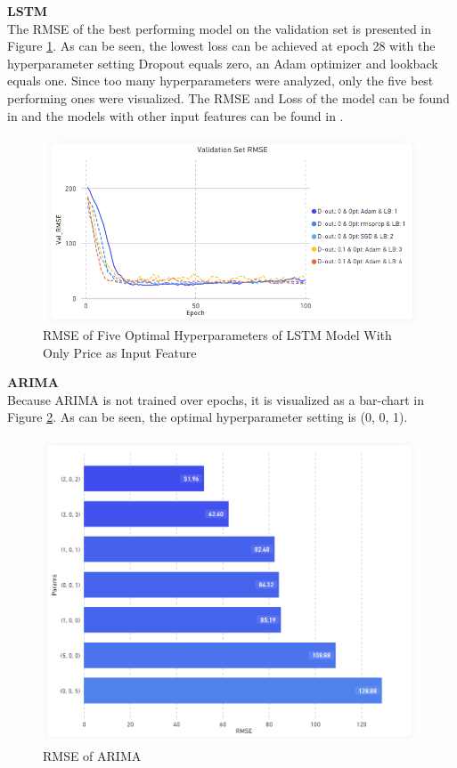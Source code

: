 \documentclass[11pt, a4paper]{article}
\begin{document}
\noindent\textbf{LSTM}\\
The RMSE of the best performing model on the validation set is presented in Figure \ref{fig:lstm_price_rmse_best_params}. As can be seen, the lowest loss can be achieved
at epoch 28 with the hyperparameter setting Dropout equals zero, an Adam optimizer and lookback equals one. Since too many hyperparameters
were analyzed, only the five best performing ones were visualized. 
The RMSE and Loss of the model can be found in  and the models with other input features can be found in .
\begin{figure}[!h]
    \centering
    \includegraphics[scale = 0.45]{Only_Price_Params_RMSE_Validation_Set.png}
    \caption{RMSE of Five Optimal Hyperparameters of LSTM Model With Only Price as Input Feature}
    \label{fig:lstm_price_rmse_best_params}
\end{figure}

\noindent\textbf{ARIMA}\\
Because ARIMA is not trained over epochs, it is visualized as a bar-chart in Figure \ref{fig:arima_rmse}. As can be seen, the optimal hyperparameter setting is (0, 0, 1).

\begin{figure}[!h]
    \centering
    \includegraphics[scale = 0.38]{ARIMA_RMSE.png}
    \caption{RMSE of ARIMA}
    \label{fig:arima_rmse}
\end{figure}
\end{document}
